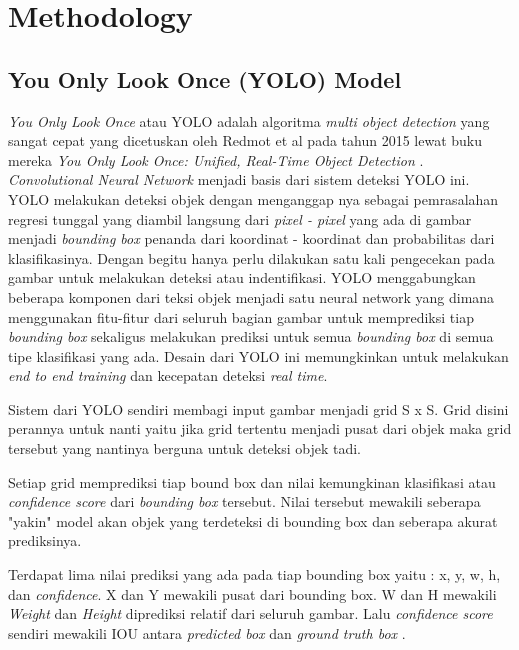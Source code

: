 \section{Methodology}
\label{sec:arsitektur}

\subsection{You Only Look Once (YOLO) Model}
\label{subsec:yolo_base}

\par \emph{You Only Look Once} atau YOLO adalah algoritma \emph{multi object detection} yang sangat cepat yang dicetuskan oleh Redmot et al pada tahun 2015 lewat buku mereka \emph{You Only Look Once: Unified, Real-Time Object Detection} \cite{redmon2016you}. \emph{Convolutional Neural Network} menjadi basis dari sistem deteksi YOLO ini. YOLO melakukan deteksi objek dengan menganggap nya sebagai pemrasalahan regresi tunggal yang diambil langsung dari \emph{pixel - pixel} yang ada di gambar menjadi \emph{bounding box} penanda dari koordinat - koordinat dan probabilitas dari klasifikasinya. Dengan begitu hanya perlu dilakukan satu kali pengecekan pada gambar untuk melakukan deteksi atau indentifikasi. \cite{redmon2016you} YOLO menggabungkan beberapa komponen dari teksi objek menjadi satu neural network yang dimana menggunakan fitu-fitur dari seluruh bagian gambar untuk memprediksi tiap \emph{bounding box} sekaligus melakukan prediksi untuk semua \emph{bounding box} di semua tipe klasifikasi yang ada. Desain dari YOLO ini memungkinkan untuk melakukan \emph{end to end training} dan kecepatan deteksi \emph{real time}.

\par Sistem dari YOLO sendiri membagi input gambar menjadi grid S x S. Grid disini perannya untuk nanti yaitu jika grid tertentu menjadi pusat dari objek maka grid tersebut yang nantinya berguna untuk deteksi objek tadi.

\par Setiap grid memprediksi tiap bound box dan nilai kemungkinan klasifikasi atau \emph{confidence score} dari \emph{bounding box} tersebut. Nilai tersebut mewakili seberapa "yakin" model akan objek yang terdeteksi di bounding box dan seberapa akurat prediksinya. 

\par Terdapat lima nilai prediksi yang ada pada tiap bounding box yaitu : x, y, w, h, dan \emph{confidence}. X dan Y mewakili pusat dari bounding box. W dan H mewakili \emph{Weight} dan \emph{Height} diprediksi relatif dari seluruh gambar. Lalu \emph{confidence score} sendiri mewakili IOU antara \emph{predicted box} dan \emph{ground truth box} \cite{redmon2016you}.

